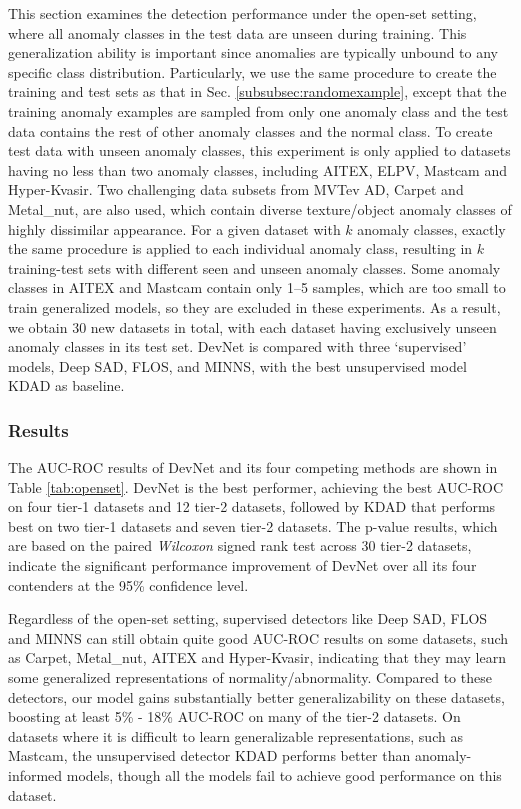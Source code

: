 \documentclass[10pt,journal,compsoc]{IEEEtran}
\begin{document}
This section examines the detection performance under the open-set setting, where all anomaly classes in the test data are unseen during training. This generalization ability is important since anomalies are typically unbound to any specific class distribution. Particularly, we use the same procedure to create the training and test sets as that in Sec. \ref{subsubsec:randomexample}, except that the training anomaly examples are sampled from only one anomaly class and the test data contains the rest of other anomaly classes and the normal class. To create test data with unseen anomaly classes, this experiment is only applied to datasets having no less than two anomaly classes, including AITEX, ELPV, Mastcam and Hyper-Kvasir. Two challenging data subsets from MVTev AD, Carpet and Metal\_nut, are also used, which contain diverse texture/object anomaly classes of highly dissimilar appearance. For a given dataset with $k$ anomaly classes, exactly the same procedure is applied to each individual anomaly class, resulting in $k$ training-test sets with different seen and unseen anomaly classes. Some anomaly classes in AITEX and Mastcam contain only 1--5 samples, which are too small to train generalized models, so they are excluded in these experiments. As a result, we obtain 30 new datasets in total, with each dataset having exclusively unseen anomaly classes in its test set. DevNet is compared with three `supervised' models, Deep SAD, FLOS, and MINNS, with the best unsupervised model KDAD as baseline.

\subsubsection{Results}

The AUC-ROC results of DevNet and its four competing methods are shown in Table \ref{tab:openset}. DevNet is the best performer, achieving the best AUC-ROC on four tier-1 datasets and 12 tier-2 datasets, followed by KDAD that performs best on two tier-1 datasets and seven tier-2 datasets. The p-value results, which are based on the paired \textit{Wilcoxon} signed rank test across 30 tier-2 datasets, indicate the significant performance improvement of DevNet over all its four contenders at the 95\% confidence level.

Regardless of the open-set setting, supervised detectors like Deep SAD, FLOS and MINNS can still obtain quite good AUC-ROC results on some datasets, such as Carpet, Metal\_nut, AITEX and Hyper-Kvasir, indicating that they may learn some generalized representations of normality/abnormality. Compared to these detectors, our model gains substantially better generalizability on these datasets, boosting at least 5\% - 18\% AUC-ROC on many of the tier-2 datasets. On datasets where it is difficult to learn generalizable representations, such as Mastcam, the unsupervised detector KDAD performs better than anomaly-informed models, though all the models fail to achieve good performance on this dataset.
\end{document}
